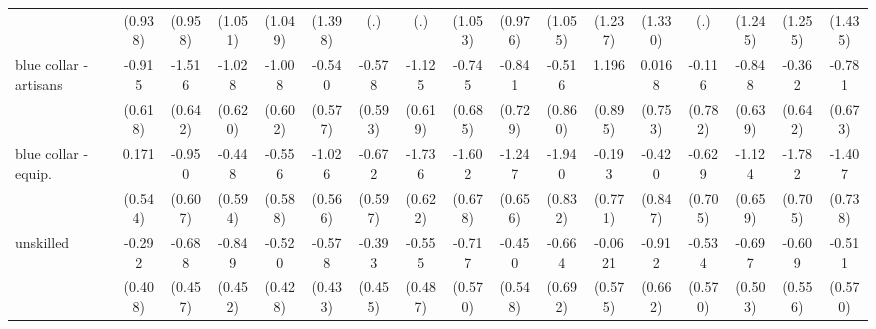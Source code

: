 {\begin{tabular}{l*{16}{c}}
                    &     (0.938)         &     (0.958)         &     (1.051)         &     (1.049)         &     (1.398)         &         (.)         &         (.)         &     (1.053)         &     (0.976)         &     (1.055)         &     (1.237)         &     (1.330)         &         (.)         &     (1.245)         &     (1.255)         &     (1.435)         \\
[1em]
blue collar - artisans&      -0.915         &      -1.516\sym{*}  &      -1.028         &      -1.008         &      -0.540         &      -0.578         &      -1.125         &      -0.745         &      -0.841         &      -0.516         &       1.196         &      0.0168         &      -0.116         &      -0.848         &      -0.362         &      -0.781         \\
                    &     (0.618)         &     (0.642)         &     (0.620)         &     (0.602)         &     (0.577)         &     (0.593)         &     (0.619)         &     (0.685)         &     (0.729)         &     (0.860)         &     (0.895)         &     (0.753)         &     (0.782)         &     (0.639)         &     (0.642)         &     (0.673)         \\
[1em]
blue collar - equip.&       0.171         &      -0.950         &      -0.448         &      -0.556         &      -1.026         &      -0.672         &      -1.736\sym{**} &      -1.602\sym{*}  &      -1.247         &      -1.940\sym{*}  &      -0.193         &      -0.420         &      -0.629         &      -1.124         &      -1.782\sym{*}  &      -1.407         \\
                    &     (0.544)         &     (0.607)         &     (0.594)         &     (0.588)         &     (0.566)         &     (0.597)         &     (0.622)         &     (0.678)         &     (0.656)         &     (0.832)         &     (0.771)         &     (0.847)         &     (0.705)         &     (0.659)         &     (0.705)         &     (0.738)         \\
[1em]
unskilled           &      -0.292         &      -0.688         &      -0.849         &      -0.520         &      -0.578         &      -0.393         &      -0.555         &      -0.717         &      -0.450         &      -0.664         &     -0.0621         &      -0.912         &      -0.534         &      -0.697         &      -0.609         &      -0.511         \\
                    &     (0.408)         &     (0.457)         &     (0.452)         &     (0.428)         &     (0.433)         &     (0.455)         &     (0.487)         &     (0.570)         &     (0.548)         &     (0.692)         &     (0.575)         &     (0.662)         &     (0.570)         &     (0.503)         &     (0.556)         &     (0.570)         \\

\end{tabular}}
